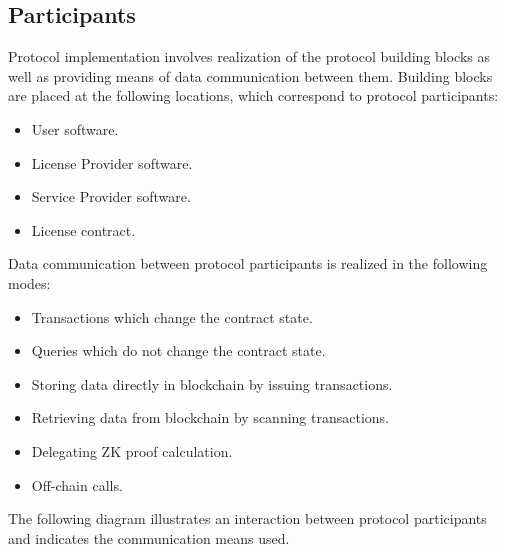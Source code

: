 
\subsection{Participants} 
Protocol implementation involves realization of the protocol building blocks as well as providing means of data communication between them. Building blocks are placed at the following locations, which correspond to protocol participants:

\begin{itemize}%
	\item User software.
	\item License Provider software.
	\item Service Provider software.
	\item License contract.
\end{itemize}

\begin{flushleft}
Data communication between protocol participants is realized in the following modes:
\end{flushleft}

\begin{itemize}%
	\item Transactions which change the contract state.
	\item Queries which do not change the contract state.
	\item Storing data directly in blockchain by issuing transactions.
	\item Retrieving data from blockchain by scanning transactions.
	\item Delegating ZK proof calculation.
	\item Off-chain calls.
\end{itemize}

\begin{flushleft}
The following diagram illustrates an interaction between protocol participants and indicates the communication means used.
\end{flushleft}

